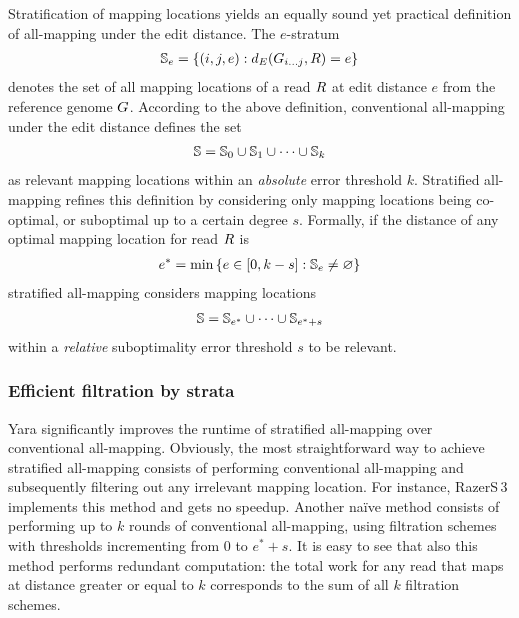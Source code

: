 Stratification of mapping locations yields an equally sound yet practical definition of all-mapping under the edit distance.
The $e$-stratum
\begin{eqnarray}
\mathbb{S}_e = \{ (i,j,e) : d_E({G}_{{i}\dots{j}},R) = e\}
\end{eqnarray}
denotes the set of all mapping locations of a read $R$ at edit distance $e$ from the reference genome $G$.
According to the above definition, conventional all-mapping under the edit distance defines the set
\begin{eqnarray}
\mathbb{S} = \mathbb{S}_0 \cup \mathbb{S}_1 \cup \dots \cup \mathbb{S}_k
\end{eqnarray}
as relevant mapping locations within an \emph{absolute} error threshold $k$.
Stratified all-mapping refines this definition by considering only mapping locations being co-optimal, or suboptimal up to a certain degree $s$.
Formally, if the distance of any optimal mapping location for read $R$ is
\begin{eqnarray}
e^* = \text{min} \,\{ e \in [0,k-s] : \mathbb{S}_e \neq \varnothing \}
\end{eqnarray}
stratified all-mapping considers mapping locations
\begin{eqnarray}
\mathbb{S} = \mathbb{S}_{e^*} \cup \dots \cup \mathbb{S}_{e^*+s}
\end{eqnarray}
within a \emph{relative} suboptimality error threshold $s$ to be relevant.

\subsubsection{Efficient filtration by strata}

Yara significantly improves the runtime of stratified all-mapping over conventional all-mapping.
Obviously, the most straightforward way to achieve stratified all-mapping consists of performing conventional all-mapping and subsequently filtering out any irrelevant mapping location.
For instance, RazerS\,3 implements this method and gets no speedup.
Another na\"ive method consists of performing up to $k$ rounds of conventional all-mapping, using filtration schemes with thresholds incrementing from $0$ to $e^*+s$.
It is easy to see that also this method performs redundant computation: the total work for any read that maps at distance greater or equal to $k$ corresponds to the sum of all $k$ filtration schemes.

